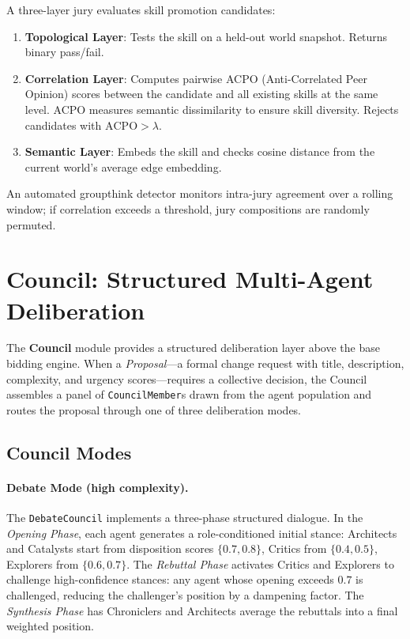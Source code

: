 \documentclass[11pt]{article}
\begin{document}
A three-layer jury evaluates skill promotion candidates:

\begin{enumerate}[noitemsep,topsep=4pt]
  \item \textbf{Topological Layer}: Tests the skill on a held-out world snapshot.
        Returns binary pass/fail.
  \item \textbf{Correlation Layer}: Computes pairwise ACPO (Anti-Correlated
        Peer Opinion) scores between the candidate and all existing skills at
        the same level. ACPO measures semantic dissimilarity to ensure skill
        diversity. Rejects candidates with $\text{ACPO} > \lambda$.
  \item \textbf{Semantic Layer}: Embeds the skill and checks cosine distance
        from the current world's average edge embedding.
\end{enumerate}

An automated groupthink detector monitors intra-jury agreement over a rolling
window; if correlation exceeds a threshold, jury compositions are randomly
permuted.

\section{Council: Structured Multi-Agent Deliberation}
\nopagebreak[4]
\label{sec:council}

The \textbf{Council} module provides a structured deliberation layer above the
base bidding engine. When a \emph{Proposal}---a formal change request with title,
description, complexity, and urgency scores---requires a collective decision,
the Council assembles a panel of \texttt{CouncilMember}s drawn from the agent
population and routes the proposal through one of three deliberation modes.

\subsection{Council Modes}

\paragraph{Debate Mode (high complexity).}
The \texttt{DebateCouncil} implements a three-phase structured dialogue. In the
\emph{Opening Phase}, each agent generates a role-conditioned initial stance:
Architects and Catalysts start from disposition scores $\{0.7, 0.8\}$, Critics
from $\{0.4, 0.5\}$, Explorers from $\{0.6, 0.7\}$. The \emph{Rebuttal Phase}
activates Critics and Explorers to challenge high-confidence stances: any agent
whose opening exceeds $0.7$ is challenged, reducing the challenger's position by
a dampening factor. The \emph{Synthesis Phase} has Chroniclers and Architects
average the rebuttals into a final weighted position.
\end{document}
